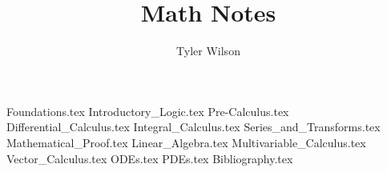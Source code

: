 \documentclass[11pt, fleqn]{article}
\title{Math Notes}
\author{Tyler Wilson}
\date{}
\begin{document}
\allowdisplaybreaks

\maketitle
\tableofcontents

{Foundations.tex}
{Introductory_Logic.tex}
{Pre-Calculus.tex}
{Differential_Calculus.tex}
{Integral_Calculus.tex}
{Series_and_Transforms.tex}
{Mathematical_Proof.tex}
{Linear_Algebra.tex}
{Multivariable_Calculus.tex}
{Vector_Calculus.tex}
{ODEs.tex}
{PDEs.tex}
{Bibliography.tex}
\end{document}
